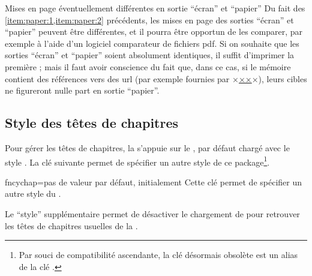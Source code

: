 \begin{dbwarning}{Mises en page éventuellement différentes en sortie
    \enquote{écran} et \enquote{papier}}{}
  Du fait des \cref{item:paper:1,item:paper:2} précédents, les mises en page
  des sorties \enquote{écran} et \enquote{papier} peuvent être différentes, et
  il pourra être opportun de les comparer, par exemple à l'aide d'un logiciel
  comparateur de fichiers \gls{pdf}. Si on souhaite que les sorties
  \enquote{écran} et \enquote{papier} soient absolument identiques, il suffit
  d'imprimer la première ; mais il faut avoir conscience du fait que, dans ce
  cas, si le mémoire contient des références vers des \acrshort{url} (par
  exemple fournies par ×\href{×\meta{\acrshort*{url}}×}{××}×),
  leurs cibles ne figureront nulle part en sortie \enquote{papier}.
\end{dbwarning}

\subsection{Style des têtes de chapitres}\label{sec:style-des-tetes}

Pour gérer les têtes de chapitres, la \yatcl{} s'appuie sur le
, par défaut chargé avec le style . La
clé  suivante permet de spécifier un autre style de ce
package\footnote{Par souci de compatibilité ascendante, la clé désormais
  obsolète  est un alias de la clé
  .}.%
%
{%
  \begin{docKey}{fncychap}{=\textbar{}\textbar{}\textbar{}\textbar{}\textbar{}\textbar{}\textbar{}\textbar{}}{pas
      de valeur par défaut, initialement }
    Cette clé permet de spécifier un autre style du .

    Le \enquote{style} supplémentaire  permet de désactiver le
    chargement de  pour retrouver les têtes de chapitres
    usuelles de la .
  \end{docKey}
}

